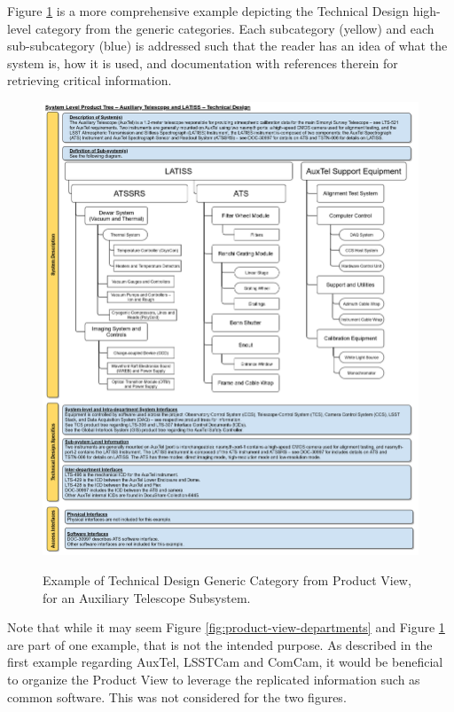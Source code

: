 Figure \ref{fig:product-view-auxtel-technical-design} is a more comprehensive example depicting the Technical Design high-level category from the generic categories.
Each subcategory (yellow) and each sub-subcategory (blue) is addressed such that the reader has an idea of what the system is, how it is used, and documentation with references therein for retrieving critical information.

\begin{figure}[pt]
\caption{Example of Technical Design Generic Category from Product View, for an Auxiliary Telescope Subsystem.}
\centering
\includegraphics[width=\textwidth]{product-view-auxtel-product-tree-technical-design}
\label{fig:product-view-auxtel-technical-design}
\end{figure}

Note that while it may seem Figure \ref{fig:product-view-departments} and Figure \ref{fig:product-view-auxtel-technical-design} are part of one example, that is not the intended purpose.
As described in the first example regarding AuxTel, LSSTCam and ComCam, it would be beneficial to organize the Product View to leverage the replicated information such as common software.
This was not considered for the two figures.


